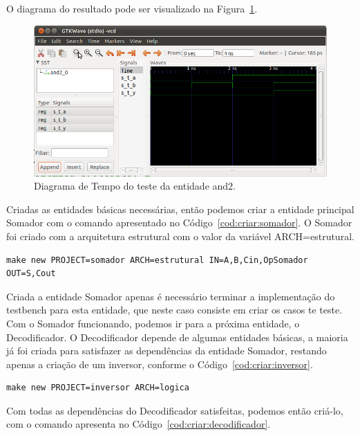 \documentclass[a4paper,11pt]{report}
\begin{document}
O diagrama do resultado pode ser visualizado na Figura~\ref{fig:gtw:and2}.

\begin{figure}[H]
\centering
\includegraphics[width=1\textwidth]{figuras/gtw_and2.png}
\caption{Diagrama de Tempo do teste da entidade and2.}
\label{fig:gtw:and2}
\end{figure}

Criadas as entidades básicas necessárias, então podemos criar a entidade principal Somador com o comando apresentado no Código~\ref{cod:criar:somador}. O Somador foi criado com a arquitetura estrutural com o valor da variável ARCH=estrutural.

\lstset{numbers=left, numberstyle=\tiny, stepnumber=1, numbersep=3pt}
\begin{lstlisting}[label=cod:criar:somador,caption=Comando para a criar a entidade Somador.]
  make new PROJECT=somador ARCH=estrutural IN=A,B,Cin,OpSomador OUT=S,Cout
\end{lstlisting}

Criada a entidade Somador apenas é necessário terminar a implementação do testbench para esta entidade, que neste caso consiste em criar os casos te teste.
Com o Somador funcionando, podemos ir para a próxima entidade, o Decodificador.
O Decodificador depende de algumas entidades básicas, a maioria já foi criada para satisfazer as dependências da entidade Somador, restando apenas a criação de um inversor, conforme o Código~\ref{cod:criar:inversor}.

\lstset{numbers=left, numberstyle=\tiny, stepnumber=1, numbersep=3pt}
\begin{lstlisting}[label=cod:criar:inversor,caption=Comando para a criar a entidade Inversor.]
  make new PROJECT=inversor ARCH=logica
\end{lstlisting}

Com todas as dependências do Decodificador satisfeitas, podemos então criá-lo, com o comando apresenta no Código~\ref{cod:criar:decodificador}.
\end{document}
